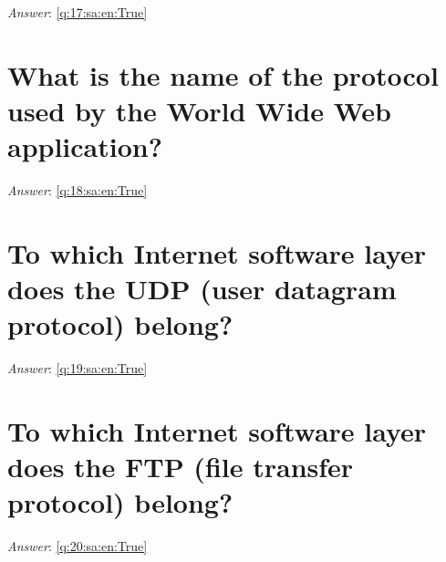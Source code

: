 \documentclass[a4paper,11pt,oneside]{book}
\begin{document}
\begin{sloppypar}
\label{q:17:sa:en:False}

\vspace{2cm}

\noindent\makebox[\textwidth]{\hrulefill}

\vspace{1cm}

\textit{Answer}: \autoref{q:17:sa:en:True}



\section{What is the name of the protocol used by the World Wide Web application?}

\label{q:18:sa:en:False}

\vspace{2cm}

\noindent\makebox[\textwidth]{\hrulefill}

\vspace{1cm}

\textit{Answer}: \autoref{q:18:sa:en:True}



\section{To which Internet software layer does the UDP (user datagram protocol) belong?}

\label{q:19:sa:en:False}

\vspace{2cm}

\noindent\makebox[\textwidth]{\hrulefill}

\vspace{1cm}

\textit{Answer}: \autoref{q:19:sa:en:True}



\section{To which Internet software layer does the FTP (file transfer protocol) belong?}

\label{q:20:sa:en:False}

\vspace{2cm}

\noindent\makebox[\textwidth]{\hrulefill}

\vspace{1cm}

\textit{Answer}: \autoref{q:20:sa:en:True}




\end{sloppypar}
\end{document}
